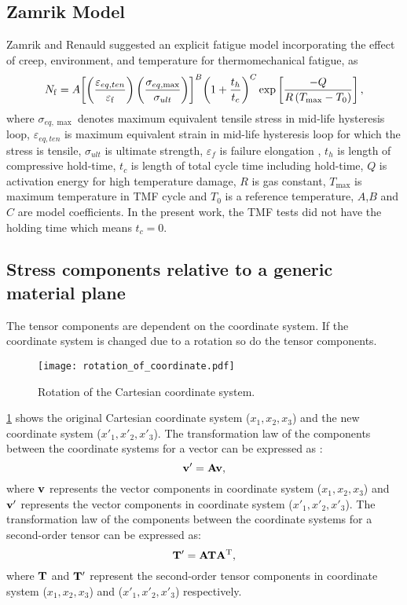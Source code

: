 \subsection{Zamrik Model}
\noindent
Zamrik and Renauld \cite{Zamrik2000} suggested an explicit fatigue model incorporating the effect of creep, environment, and temperature for thermomechanical fatigue, as
\begin{equation}
{N_{\rm f}} = A{\left[ {\left( {\frac{{{\varepsilon _{eq,ten}}}}{{{\varepsilon _{\rm f}}}}} \right)\left( {\frac{{{\sigma _{eq,\max }}}}{{{\sigma _{ult}}}}} \right)} \right]^B} 
{\left( {1 + \frac{{{t_h}}}{{{t_c}}}} \right)^C} \exp \left[ {\frac{{ - Q}}{{R\left( {{T_{\max }} - {T_0}} \right)}}} \right],
\label{Equ:Zamrik_model}
\end{equation}
where $\sigma _{eq,\max }$ denotes maximum equivalent tensile stress in mid-life hysteresis loop, $\varepsilon _{eq,ten}$ is maximum equivalent strain in mid-life hysteresis loop for which the stress is tensile, $\sigma _{ult}$ is ultimate strength, $\varepsilon _{f}$ is failure elongation , $t_h$ is length of compressive hold-time, $t_c$ is length of total cycle time including hold-time, $Q$ is activation energy for high temperature damage, $R$ is gas constant, $T_{\max}$ is maximum temperature in TMF cycle and $T_0$ is a reference temperature, $A$,$B$ and $C$ are model coefficients. In the present work, the TMF tests did not have the holding time which means $t_c=0$.

\subsection{Stress components relative to a generic material plane}
\noindent
The tensor components are dependent on the coordinate system.
If the coordinate system is changed due to a rotation so do the tensor components.
\begin{figure}
\centering
\texttt{[image: rotation\_of\_coordinate.pdf]}
\caption{Rotation of the Cartesian coordinate system.}
\label{Fig:rotation_of_coordinate}
\end{figure}
\ref{Fig:rotation_of_coordinate} shows the original Cartesian coordinate system ($x_1,x_2,x_3$) and the new coordinate system ($x'_1,x'_2,x'_3$).
The transformation law of the components between the coordinate systems for a vector can be expressed as \cite{Chaves2013Notes}:
\begin{equation}
\bf{v'} = {\bf{A}}\bf{v},
\label{Equ:coordinate_transformation_of_vector}
\end{equation}
where $\bf{v}$ represents the vector components in coordinate system ($x_1,x_2,x_3$) and $\bf{v'}$ represents the vector components in coordinate system ($x'_1,x'_2,x'_3$).
The transformation law of the components between the coordinate systems for a second-order tensor can be expressed as:
\begin{equation}
{\bf{T'}} = {\bf{AT}}{{\bf{A}}^{\rm{T}}},
\label{Equ:coordinate_transformation_of_tensor}
\end{equation}
where $\bf{T}$ and $\bf{T'}$ represent the second-order tensor components in coordinate system ($x_1,x_2,x_3$) and ($x'_1,x'_2,x'_3$) respectively.

